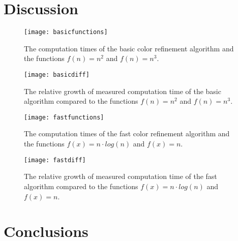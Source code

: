 \documentclass[twoside]{article}
\begin{document}
\begin{multicols}{2}
\section{Discussion} %
\label{disc}

\begin{figure}[H]
	\texttt{[image: basicfunctions]}
	\caption{The computation times of the basic color refinement algorithm and the functions $f(n)=n^2$ and $f(n)=n^3$.}
	\label{fig:basicfunctions}
\end{figure}

\begin{figure}[H]
	\texttt{[image: basicdiff]}
	\caption{The relative growth of measured computation time of the basic algorithm compared to the functions $f(n)=n^2$ and $f(n)=n^3$.}
	\label{fig:basicgrowth}
\end{figure}

\begin{figure}[H]
	\texttt{[image: fastfunctions]}
	\caption{The computation times of the fast color refinement algorithm and the functions $f(x)=n\cdot log(n)$ and $f(x)=n$.}
	\label{fig:fastgrowth}
\end{figure}

\begin{figure}[H]
	\texttt{[image: fastdiff]}
	\caption{The relative growth of measured computation time of the fast algorithm compared to the functions $f(x)=n\cdot log(n)$ and $f(x)=n$.}
	\label{fig:fastfunctions}
\end{figure}

\section{Conclusions}
\label{concl}

\label{references}
\printbibliography


\end{multicols}
\end{document}
